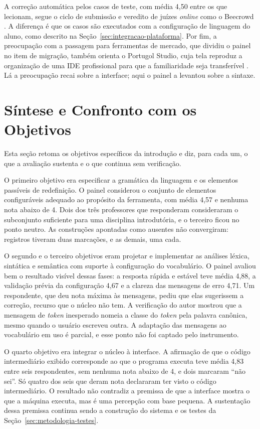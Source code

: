 A correção automática pelos casos de teste, com média 4,50 entre os que lecionam, segue o ciclo de submissão e veredito de juízes \textit{online} como o Beecrowd \cite{beecrowd2026faq}. A diferença é que os casos são executados com a configuração de linguagem do aluno, como descrito na Seção~\ref{sec:integracao-plataforma}. Por fim, a preocupação com a passagem para ferramentas de mercado, que dividiu o painel no item de migração, também orienta o Portugol Studio, cuja tela reproduz a organização de uma IDE profissional para que a familiaridade seja transferível \cite{univali2026}. Lá a preocupação recai sobre a interface; aqui o painel a levantou sobre a sintaxe.

\section{Síntese e Confronto com os Objetivos}
\label{sec:resultado-sintese}

Esta seção retoma os objetivos específicos da introdução e diz, para cada um, o que a avaliação sustenta e o que continua sem verificação.

O primeiro objetivo era especificar a gramática da linguagem e os elementos passíveis de redefinição. O painel considerou o conjunto de elementos configuráveis adequado ao propósito da ferramenta, com média 4,57 e nenhuma nota abaixo de 4. Dois dos três professores que responderam consideraram o subconjunto suficiente para uma disciplina introdutória, e o terceiro ficou no ponto neutro. As construções apontadas como ausentes não convergiram: registros tiveram duas marcações, e as demais, uma cada.

O segundo e o terceiro objetivos eram projetar e implementar as análises léxica, sintática e semântica com suporte à configuração do vocabulário. O painel avaliou bem o resultado visível dessas fases: a resposta rápida e estável teve média 4,88, a validação prévia da configuração 4,67 e a clareza das mensagens de erro 4,71. Um respondente, que deu nota máxima às mensagens, pediu que elas sugerissem a correção, recurso que o núcleo não tem. A verificação do autor mostrou que a mensagem de \textit{token} inesperado nomeia a classe do \textit{token} pela palavra canônica, mesmo quando o usuário escreveu outra. A adaptação das mensagens ao vocabulário em uso é parcial, e esse ponto não foi captado pelo instrumento.

O quarto objetivo era integrar o núcleo à interface. A afirmação de que o código intermediário exibido corresponde ao que o programa executa teve média 4,83 entre seis respondentes, sem nenhuma nota abaixo de 4, e dois marcaram ``não sei''. Só quatro dos seis que deram nota declararam ter visto o código intermediário. O resultado não contradiz a premissa de que a interface mostra o que a máquina executa, mas é uma percepção com base pequena. A sustentação dessa premissa continua sendo a construção do sistema e os testes da Seção~\ref{sec:metodologia-testes}.

